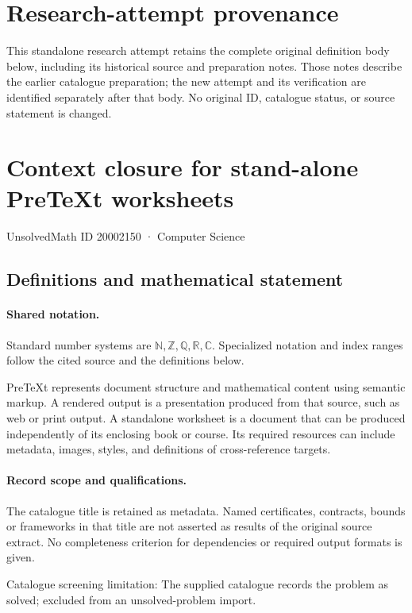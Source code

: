 \documentclass[11pt]{article}
\begin{document}
\section*{Research-attempt provenance}
This standalone research attempt retains the complete original definition body below,
including its historical source and preparation notes. Those notes describe the
earlier catalogue preparation; the new attempt and its verification are identified
separately after that body. No original ID, catalogue status, or source statement is changed.

\section{Context closure for stand-alone PreTeXt worksheets}\label{20002150}
{\small UnsolvedMath ID 20002150 · Computer Science}
\subsection{Definitions and mathematical statement}

\paragraph{Shared notation.}Standard number systems are $\mathbb N,\mathbb Z,\mathbb Q,\mathbb R,\mathbb C$. Specialized notation and index ranges follow the cited source and the definitions below.


PreTeXt represents document structure and mathematical content using semantic markup. A rendered output is a presentation produced from that source, such as web or print output. A standalone worksheet is a document that can be produced independently of its enclosing book or course. Its required resources can include metadata, images, styles, and definitions of cross-reference targets.
\paragraph{Record scope and qualifications.}
The catalogue title is retained as metadata. Named certificates, contracts, bounds or frameworks in that title are not asserted as results of the original source extract.
No completeness criterion for dependencies or required output formats is given.

Catalogue screening limitation: The supplied catalogue records the problem as solved; excluded from an unsolved-problem import.
\end{document}
